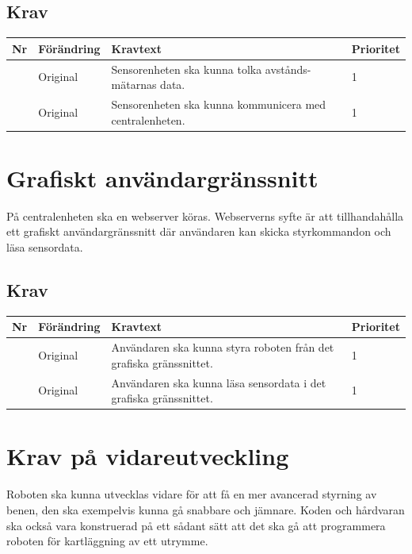 \documentclass[a4paper,titlepage,12pt]{article}
\newcounter{reqNr}
\newcommand{\nextReqNr}{\stepcounter{reqNr}\arabic{reqNr}}
\begin{document}
	\subsection{Krav}
	\begin{longtable}[c]{ c l>{\raggedright}p{} l }
		\textbf{Nr} & \textbf{Förändring} & \textbf{Kravtext} & \textbf{Prioritet} 
			\\ \midrule

		\nextReqNr{} & Original & Sensorenheten ska kunna tolka avstånds- mätarnas data. & 1
			\\ \midrule

		\nextReqNr{} & Original & Sensorenheten ska kunna kommunicera med 
			centralenheten. & 1

	\end{longtable}

    \section{Grafiskt användargränssnitt}
    På centralenheten ska en webserver köras. Webserverns syfte är att
    tillhandahålla ett grafiskt användargränssnitt där användaren kan skicka
    styrkommandon och läsa sensordata.
	\subsection{Krav}
	\begin{longtable}[c]{ c l>{\raggedright}p{} l }
		\textbf{Nr} & \textbf{Förändring} & \textbf{Kravtext} & \textbf{Prioritet} 
		\\ \midrule

		\nextReqNr{} & Original & Användaren ska kunna styra roboten från
								  det grafiska gränssnittet. & 1
		\\ \midrule

		\nextReqNr{} & Original & Användaren ska kunna läsa sensordata i det
								  grafiska gränssnittet. & 1

	\end{longtable}

	\section{Krav på vidareutveckling}
	Roboten ska kunna utvecklas vidare för att få en mer avancerad styrning av benen, 
	den ska exempelvis kunna gå snabbare och jämnare. Koden och hårdvaran ska också vara
	konstruerad på ett sådant sätt att det ska gå att programmera roboten för
	kartläggning av ett utrymme.
\end{document}

